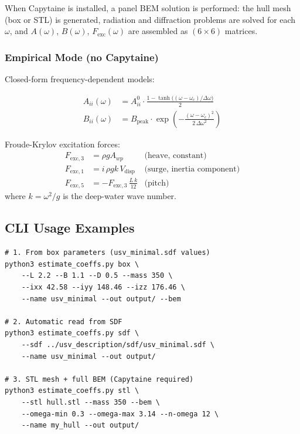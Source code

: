 \documentclass[12pt,a4paper]{article}
\begin{document}
When Capytaine is installed, a panel BEM solution is performed:
the hull mesh (box or STL) is generated, radiation and diffraction
problems are solved for each $\omega$, and $A(\omega)$, $B(\omega)$,
$F_{\text{exc}}(\omega)$ are assembled as $(6\times6)$ matrices.

\subsubsection{Empirical Mode (no Capytaine)}

Closed-form frequency-dependent models:

\begin{align}
  A_{ii}(\omega) &= A_{ii}^0 \cdot
    \frac{1 - \tanh\!\bigl((\omega-\omega_c)/\Delta\omega\bigr)}{2}
  \label{eq:a_emp}\\[4pt]
  B_{ii}(\omega) &= B_{\text{peak}} \cdot
    \exp\!\left(-\frac{(\omega-\omega_c)^2}{2\,\Delta\omega^2}\right)
  \label{eq:b_emp}
\end{align}

Froude-Krylov excitation forces:
\begin{align}
  F_{\text{exc},3} &= \rho g A_{wp}
  &\text{(heave, constant)}\\
  F_{\text{exc},1} &= i\,\rho g k\,V_{\text{disp}}
  &\text{(surge, inertia component)}\\
  F_{\text{exc},5} &= -F_{\text{exc},3}\,\frac{L\,k}{12}
  &\text{(pitch)}
  \label{eq:fexc_e}
\end{align}
where $k = \omega^2/g$ is the deep-water wave number.

\subsection{CLI Usage Examples}

\begin{lstlisting}
# 1. From box parameters (usv_minimal.sdf values)
python3 estimate_coeffs.py box \
    --L 2.2 --B 1.1 --D 0.5 --mass 350 \
    --ixx 42.58 --iyy 148.46 --izz 176.46 \
    --name usv_minimal --out output/ --bem

# 2. Automatic read from SDF
python3 estimate_coeffs.py sdf \
    --sdf ../usv_description/sdf/usv_minimal.sdf \
    --name usv_minimal --out output/

# 3. STL mesh + full BEM (Capytaine required)
python3 estimate_coeffs.py stl \
    --stl hull.stl --mass 350 --bem \
    --omega-min 0.3 --omega-max 3.14 --n-omega 12 \
    --name my_hull --out output/
\end{lstlisting}
\end{document}
